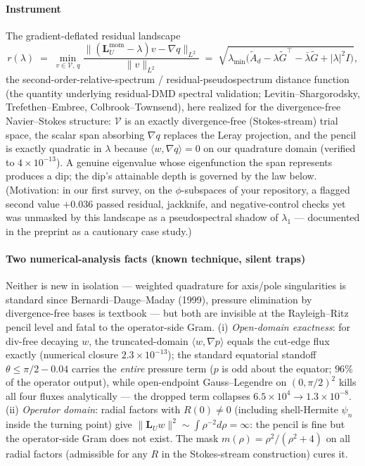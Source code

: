 \documentclass[10pt]{article}
\newcommand{\LU}{\mathbf{L}_{U}}
\begin{document}
\paragraph{Instrument} The gradient-deflated residual landscape
\[
r(\lambda) \;=\; \min_{v \in \mathcal{V},\, q}
\frac{\|(\LU^{\mathrm{mom}} - \lambda) v - \nabla q\|_{L^2}}{\|v\|_{L^2}}
\;=\;\sqrt{\lambda_{\min}\!\bigl(\tilde A_d
 - \lambda \tilde G^{\!\top} - \bar\lambda \tilde G
 + |\lambda|^2 I\bigr)},
\]
the second-order-relative-spectrum / residual-pseudospectrum distance
function (the quantity underlying residual-DMD spectral validation;
Levitin--Shargorodsky, Trefethen--Embree, Colbrook--Townsend), here
realized for the divergence-free Navier--Stokes structure: $\mathcal{V}$
is an exactly divergence-free
(Stokes-stream) trial space, the scalar span absorbing $\nabla q$
replaces the Leray projection, and the pencil is exactly quadratic in
$\lambda$ because $\langle w, \nabla q\rangle = 0$ on our quadrature
domain (verified to $4\times 10^{-13}$). A genuine eigenvalue whose
eigenfunction the span represents produces a dip; the dip's attainable
depth is governed by the law below. (Motivation: in our first survey,
on the $\phi$-subspaces of your repository, a flagged second value
$+0.036$ passed residual, jackknife, and negative-control checks yet
was unmasked by this landscape as a pseudospectral shadow of
$\lambda_1$ --- documented in the preprint as a cautionary case study.)

\paragraph{Two numerical-analysis facts (known technique, silent traps)} Neither is new in isolation --- weighted quadrature for axis/pole singularities is standard since Bernardi--Dauge--Maday (1999), pressure elimination by divergence-free bases is textbook --- but both are invisible at the Rayleigh--Ritz pencil level and fatal to the operator-side Gram.
(i) \emph{Open-domain exactness}: for div-free decaying $w$, the
truncated-domain $\langle w, \nabla p\rangle$ equals the cut-edge flux
exactly (numerical closure $2.3\times 10^{-13}$); the standard
equatorial standoff $\theta \le \pi/2 - 0.04$ carries the
\emph{entire} pressure term ($p$ is odd about the equator;
$96\%$ of the operator output), while open-endpoint Gauss--Legendre on
$(0,\pi/2)^2$ kills all four fluxes analytically --- the dropped term
collapses $6.5\times 10^{4} \to 1.3\times 10^{-8}$.
(ii) \emph{Operator domain}: radial factors with $R(0) \ne 0$ (including
shell-Hermite $\psi_n$ inside the turning point) give
$\|\LU w\|^2 \sim \int \rho^{-2} d\rho = \infty$: the pencil is fine
but the operator-side Gram does not exist. The mask
$m(\rho) = \rho^2/(\rho^2 + 4)$ on all radial factors (admissible for
any $R$ in the Stokes-stream construction) cures it.
\end{document}
